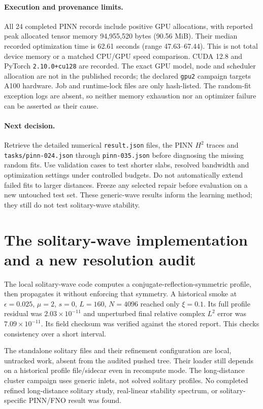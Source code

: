\documentclass[11pt]{article}
\begin{document}
\paragraph{Execution and provenance limits.}
All 24 completed PINN records include positive GPU allocations, with reported
peak allocated tensor memory 94,955,520 bytes (90.56 MiB). Their median recorded
optimization time is 62.61 seconds (range 47.63--67.44). This is not total device
memory or a matched CPU/GPU speed comparison. CUDA 12.8 and PyTorch
\texttt{2.10.0+cu128} are recorded. The exact GPU model, node and scheduler
allocation are not in the published records; the declared \texttt{gpu2}
campaign targets A100 hardware. Job and runtime-lock files are only hash-listed.
The random-fit exception logs are absent, so neither memory exhaustion nor an
optimizer failure can be asserted as their cause.

\paragraph{Next decision.}
Retrieve the detailed numerical \texttt{result.json} files, the PINN $H^2$
traces and \texttt{tasks/pinn-024.json} through \texttt{pinn-035.json} before
diagnosing the missing random fits. Use validation cases to test shorter slabs,
resolved bandwidth and optimization settings under controlled budgets. Do not
automatically extend failed fits to larger distances. Freeze any selected repair
before evaluation on a new untouched test set. These generic-wave results inform
the learning method; they still do not test solitary-wave stability.

\newpage
\section{The solitary-wave implementation and a new resolution audit}\label{sec:projection}
The local solitary-wave code computes a conjugate-reflection-symmetric profile,
then propagates it without enforcing that symmetry. A historical smoke at
$\epsilon=0.025$, $\mu=2$, $s=0$, $L=160$, $N=4096$ reached only $\xi=0.1$.
Its full profile residual was $2.03\times10^{-11}$ and unperturbed final relative
complex $L^2$ error was $7.09\times10^{-11}$. Its field checksum was verified
against the stored report. This checks consistency over a short interval.

The standalone solitary files and their refinement configuration are local,
untracked work, absent from the audited pushed tree. Their loader still depends
on a historical profile file/sidecar even in recompute mode. The long-distance
cluster campaign uses generic inlets, not solved solitary profiles. No completed
refined long-distance solitary study, real-linear stability spectrum, or
solitary-specific PINN/FNO result was found.
\end{document}
